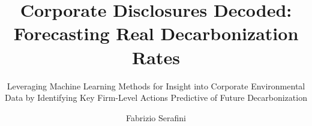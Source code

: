 \title{Corporate Disclosures Decoded: Forecasting Real Decarbonization Rates}
\subtitle{Leveraging Machine Learning Methods for Insight into Corporate Environmental Data by Identifying Key Firm-Level Actions Predictive of Future Decarbonization}
\author{Fabrizio Serafini}


